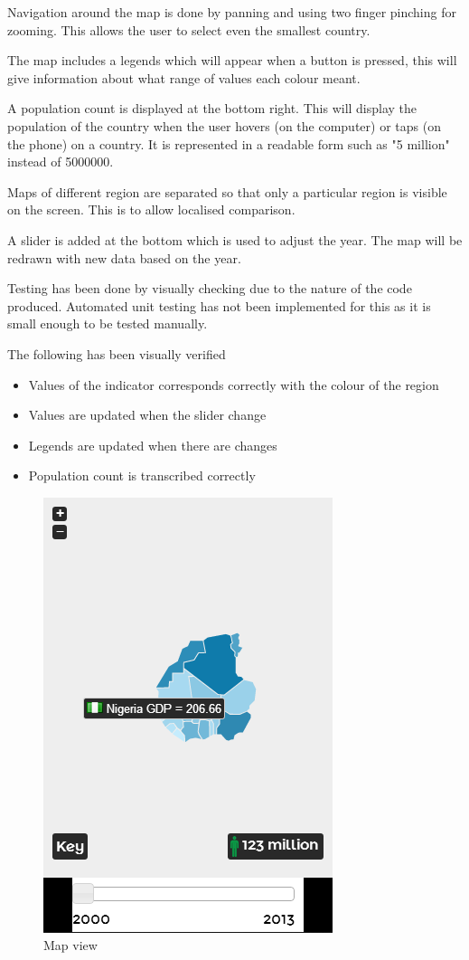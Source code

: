 \documentclass[12pt,a4paper,twoside]{article}
\begin{document}
Navigation around the map is done by panning and using two finger pinching for zooming. This allows the user to select even the smallest country.

The map includes a legends which will appear when a button is pressed, this will give information about what range of values each colour meant.

A population count is displayed at the bottom right. This will display the population of the country when the user hovers (on the computer) or taps (on the phone) on a country. It is represented in a readable form such as "5 million" instead of 5000000.

Maps of different region are separated so that only a particular region is visible on the screen. This is to allow localised comparison. 

A slider is added at the bottom which is used to adjust the year. The map will be redrawn with new data based on the year. 

Testing has been done by visually checking due to the nature of the code produced. Automated unit testing has not been implemented for this as it is small enough to be tested manually.

The following has been visually verified


\begin{itemize}
	\item Values of the indicator corresponds correctly with the colour of the region
	\item Values are updated when the slider change
	\item Legends are updated when there are changes
	\item Population count is transcribed correctly
\end{itemize}


\begin{figure}[H]
\centering
\includegraphics[scale=0.7]{visualisation/map_view.png}
\caption{Map view}
\end{figure}
\end{document}

